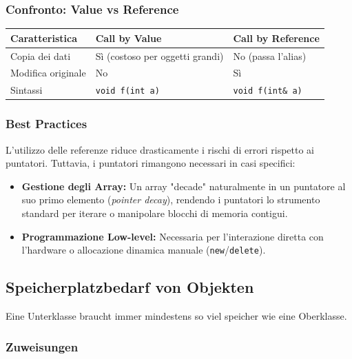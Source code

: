\subsubsection{Confronto: Value vs Reference}
\begin{center}
\begin{tabular}{@{}lll@{}}
\toprule
\textbf{Caratteristica} & \textbf{Call by Value} & \textbf{Call by Reference} \\ \midrule
Copia dei dati          & Sì (costoso per oggetti grandi) & No (passa l'alias) \\
Modifica originale      & No                             & Sì \\
Sintassi                & \texttt{void f(int a)}         & \texttt{void f(int\& a)} \\ \bottomrule
\end{tabular}
\end{center}

\subsubsection{Best Practices}
L'utilizzo delle referenze riduce drasticamente i rischi di errori rispetto ai puntatori. Tuttavia, i puntatori rimangono necessari in casi specifici:
\begin{itemize}
    \item \textbf{Gestione degli Array:} Un array "decade" naturalmente in un puntatore al suo primo elemento (\textit{pointer decay}), rendendo i puntatori lo strumento standard per iterare o manipolare blocchi di memoria contigui.
    \item \textbf{Programmazione Low-level:} Necessaria per l'interazione diretta con l'hardware o allocazione dinamica manuale (\texttt{new}/\texttt{delete}).
\end{itemize}



\subsection{Speicherplatzbedarf von Objekten}

Eine Unterklasse braucht immer mindestens so viel speicher wie eine Oberklasse.

\subsubsection{Zuweisungen}

